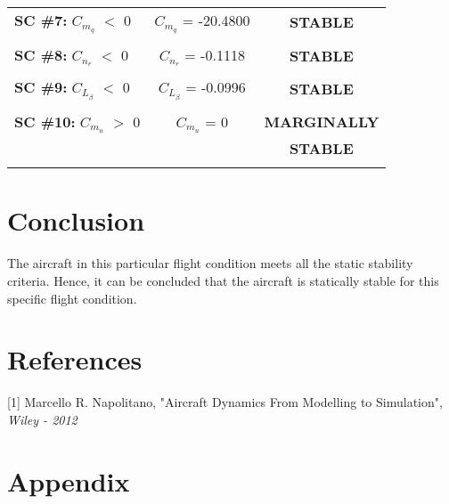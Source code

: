\documentclass[letterpaper,12pt]{article}
\begin{document}
\begin{center}
\begin{tabular}{lcc}
\textbf{SC \#7:} $C_{m_q}$ $<$ 0 &\hspace*{2cm} $C_{m_q}$ = -20.4800 &\hspace*{2cm} \textbf{STABLE}\\ \\
\textbf{SC \#8:} $C_{n_r}$ $<$ 0 &\hspace*{2cm} $C_{n_r}$ = -0.1118 &\hspace*{2cm} \textbf{STABLE}\\ \\
\textbf{SC \#9:} $C_{L_\beta}$ $<$ 0 &\hspace*{2cm} $C_{L_\beta}$ = -0.0996 &\hspace*{2cm} \textbf{STABLE}\\ \\
\textbf{SC \#10:} $C_{m_u}$ $>$ 0 &\hspace*{2cm} $C_{m_u}$ = 0 &\hspace*{2cm} \textbf{MARGINALLY}\\
&\hspace*{2cm} &\hspace*{2cm}   \textbf{STABLE} \\ \\ \hline
\end{tabular}
\end{center}
\section{Conclusion}
The aircraft in this particular flight condition meets all the static stability criteria. Hence, it can be concluded that the aircraft is statically stable for this specific flight condition.
\section{References}
[1] Marcello R. Napolitano, "Aircraft Dynamics From Modelling to Simulation", \textit{Wiley - 2012}
\section{Appendix}
\end{document}
